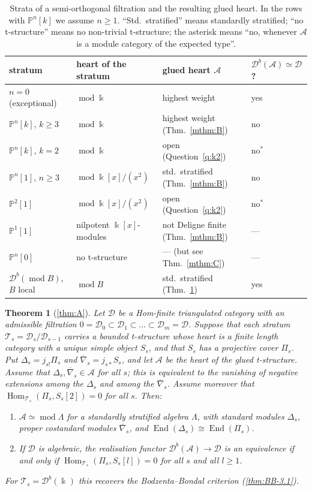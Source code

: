 \documentclass[11pt,reqno]{amsart}
\theoremstyle{plain}
\newtheorem{maintheorem}{Theorem}
\theoremstyle{definition}
\theoremstyle{remark}
\newcommand{\kk}{\Bbbk}
\DeclareMathOperator{\Hom}{Hom}
\DeclareMathOperator{\End}{End}
\newcommand{\modd}{\operatorname{mod}}
\newcommand{\Db}{\mathcal{D}^b}
\newcommand{\Pn}[2]{\mathbb{P}^{#1}[#2]}
\newcommand{\nablabar}{\overline{\nabla}}
\newcommand{\cD}{\mathcal{D}}
\newcommand{\cA}{\mathcal{A}}
\newcommand{\cT}{\mathcal{T}}
\begin{document}
\begin{table}[ht]
\centering
\renewcommand{\arraystretch}{1.25}
\small
\begin{tabular}{@{}llll@{}}
\toprule
stratum & heart of the stratum & glued heart $\cA$ & $\Db(\cA)\simeq\cD$? \\
\midrule
$n=0$ (exceptional) & $\modd\kk$ & highest weight \cite{BB26} & yes \\
$\Pn nk$, $k\ge 3$ & $\modd\kk$ & highest weight (Thm.~\ref{mthm:B}) & no \\
$\Pn nk$, $k=2$ & $\modd\kk$ & open (Question~\ref{q:k2}) & no$^{\ast}$ \\
$\Pn n1$, $n\ge 3$ & $\modd\kk[x]/(x^2)$ & std.\ stratified (Thm.~\ref{mthm:B}) & no \\
$\Pn 21$ & $\modd\kk[x]/(x^2)$ & open (Question~\ref{q:k2}) & no$^{\ast}$ \\
$\Pn 11$ & nilpotent $\kk[x]$-modules & not Deligne finite (Thm.~\ref{mthm:B}) & --- \\
$\Pn n0$ & no t-structure \cite{Bonf26} & --- (but see Thm.~\ref{mthm:C}) & --- \\
$\Db(\modd B)$, $B$ local & $\modd B$ & std.\ stratified (Thm.~\ref{mthm:A}) & yes \\
\bottomrule
\end{tabular}
\caption{Strata of a semi-orthogonal filtration and the resulting glued heart. In the rows with $\Pn nk$ we assume $n\ge1$. ``Std.\ stratified'' means standardly stratified; ``no t-structure'' means no non-trivial t-structure; the asterisk means ``no, whenever $\cA$ is a module category of the expected type''.}\label{tab:summary}
\end{table}

\begin{maintheorem}[\cref{thm:A}]\label{mthm:A}
Let $\cD$ be a Hom-finite triangulated category with an admissible filtration $0=\cD_0\subset\cD_1\subset\dots\subset\cD_m=\cD$. Suppose that each stratum $\cT_s=\cD_s/\cD_{s-1}$ carries a bounded t-structure whose heart is a finite length category with a unique simple object $S_s$, and that $S_s$ has a projective cover $\Pi_s$. Put $\Delta_s=j_{s!}\Pi_s$ and $\nablabar_s=j_{s*}S_s$, and let $\cA$ be the heart of the glued t-structure. Assume that $\Delta_s,\nablabar_s\in\cA$ for all $s$; this is equivalent to the vanishing of negative extensions among the $\Delta_s$ and among the $\nablabar_s$. Assume moreover that $\Hom_{\cT_s}(\Pi_s,S_s[2])=0$ for all $s$. Then:
\begin{enumerate}
\item $\cA\simeq\modd\Lambda$ for a standardly stratified algebra $\Lambda$, with standard modules $\Delta_s$, proper costandard modules $\nablabar_s$, and $\End(\Delta_s)\cong\End(\Pi_s)$.
\item If $\cD$ is algebraic, the realisation functor $\Db(\cA)\to\cD$ is an equivalence if and only if $\Hom_{\cT_s}(\Pi_s,S_s[l])=0$ for all $s$ and all $l\ge1$.
\end{enumerate}
For $\cT_s=\Db(\kk)$ this recovers the Bodzenta--Bondal criterion (\cref{thm:BB-3.1}).
\end{maintheorem}
\end{document}
